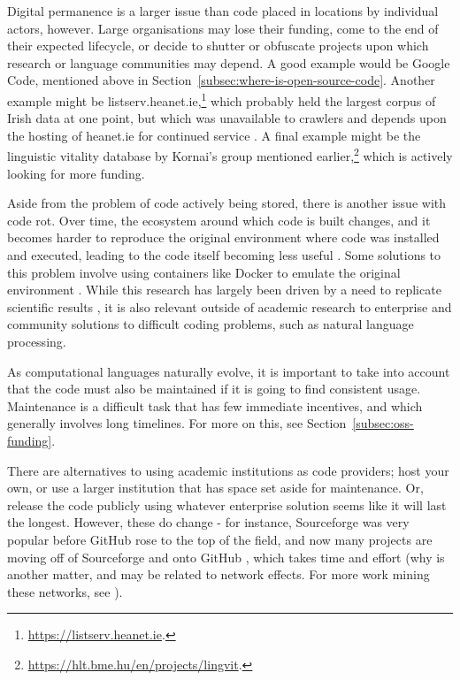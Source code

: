 Digital permanence is a larger issue than code placed in locations by individual actors, however. Large organisations may lose their funding, come to the end of their expected lifecycle, or decide to shutter or obfuscate projects upon which research or language communities may depend. A good example would be Google Code, mentioned above in Section~\ref{subsec:where-is-open-source-code}. Another example might be listserv.heanet.ie,\footnote{\href{https://listserv.heanet.ie}{https://listserv.heanet.ie}. } which probably held the largest corpus of Irish data at one point, but which was unavailable to crawlers and depends upon the hosting of heanet.ie for continued service \citep{scannell2007crubadan}. A final example might be the linguistic vitality database by Kornai's group mentioned earlier,\footnote{\href{https://hlt.bme.hu/en/projects/lingvit}{https://hlt.bme.hu/en/projects/lingvit}. } which is actively looking for more funding.

Aside from the problem of code actively being stored, there is another issue with code rot. Over time, the ecosystem around which code is built changes, and it becomes harder to reproduce the original environment where code was installed and executed, leading to the code itself becoming less useful \citep{eide2010toward}. Some solutions to this problem involve using containers like Docker to emulate the original environment \citep{boettiger2015introduction}. While this research has largely been driven by a need to replicate scientific results \citep{schwab2000making, barnes2010publish, ince2012case}, it is also relevant outside of academic research to enterprise and community solutions to difficult coding problems, such as natural language processing.

As computational languages naturally evolve, it is important to take into account that the code must also be maintained if it is going to find consistent usage. Maintenance is a difficult task that has few immediate incentives, and which generally involves long timelines. For more on this, see Section~\ref{subsec:oss-funding}.


There are alternatives to using academic institutions as code providers; host your own, or use a larger institution that has space set aside for maintenance. Or, release the code publicly using whatever enterprise solution seems like it will last the longest. However, these do change - for instance, Sourceforge was very popular before GitHub rose to the top of the field, and now many projects are moving off of Sourceforge and onto GitHub \citep{finley2011github}, which takes time and effort (why is another matter, and may be related to network effects. For more work mining these networks, see \citet{thung2013network, kalliamvakou2014promises}).

